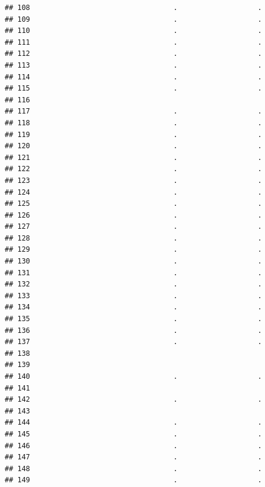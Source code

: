\documentclass[
]{article}
\begin{document}
\begin{verbatim}
## 108                                  .                   .
## 109                                  .                   .
## 110                                  .                   .
## 111                                  .                   .
## 112                                  .                   .
## 113                                  .                   .
## 114                                  .                   .
## 115                                  .                   .
## 116                                                       
## 117                                  .                   .
## 118                                  .                   .
## 119                                  .                   .
## 120                                  .                   .
## 121                                  .                   .
## 122                                  .                   .
## 123                                  .                   .
## 124                                  .                   .
## 125                                  .                   .
## 126                                  .                   .
## 127                                  .                   .
## 128                                  .                   .
## 129                                  .                   .
## 130                                  .                   .
## 131                                  .                   .
## 132                                  .                   .
## 133                                  .                   .
## 134                                  .                   .
## 135                                  .                   .
## 136                                  .                   .
## 137                                  .                   .
## 138                                                       
## 139                                                       
## 140                                  .                   .
## 141                                                       
## 142                                  .                   .
## 143                                                       
## 144                                  .                   .
## 145                                  .                   .
## 146                                  .                   .
## 147                                  .                   .
## 148                                  .                   .
## 149                                  .                   .

\end{verbatim}
\end{document}
